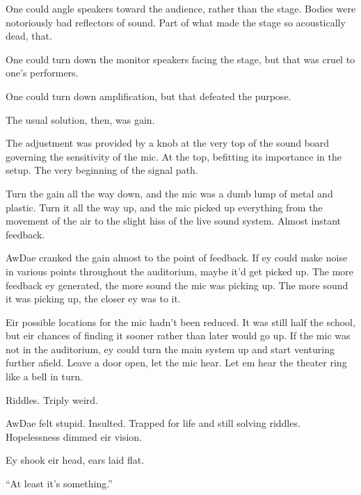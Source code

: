 One could angle speakers toward the audience, rather than the stage. Bodies were notoriously bad reflectors of sound. Part of what made the stage so acoustically dead, that.

One could turn down the monitor speakers facing the stage, but that was cruel to one's performers.

One could turn down amplification, but that defeated the purpose.

The usual solution, then, was gain.

The adjustment was provided by a knob at the very top of the sound board governing the sensitivity of the mic. At the top, befitting its importance in the setup. The very beginning of the signal path.

Turn the gain all the way down, and the mic was a dumb lump of metal and plastic. Turn it all the way up, and the mic picked up everything from the movement of the air to the slight hiss of the live sound system. Almost instant feedback.

AwDae cranked the gain almost to the point of feedback. If ey could make noise in various points throughout the auditorium, maybe it'd get picked up. The more feedback ey generated, the more sound the mic was picking up. The more sound it was picking up, the closer ey was to it.

Eir possible locations for the mic hadn't been reduced. It was still half the school, but eir chances of finding it sooner rather than later would go up. If the mic was not in the auditorium, ey could turn the main system up and start venturing further afield. Leave a door open, let the mic hear. Let em hear the theater ring like a bell in turn.

Riddles. Triply weird.

AwDae felt stupid. Insulted. Trapped for life and still solving riddles. Hopelessness dimmed eir vision.

Ey shook eir head, ears laid flat.

``At least it's something.''
